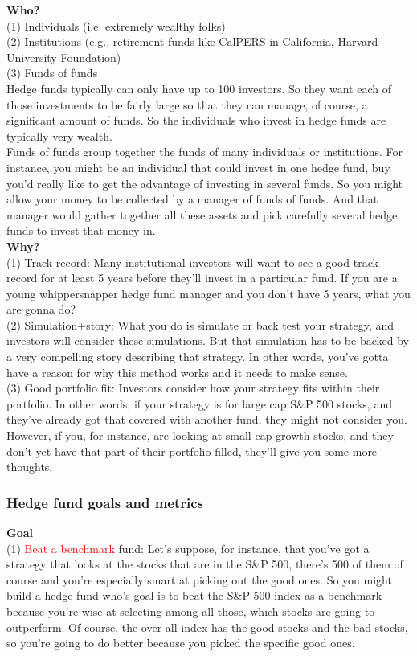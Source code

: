\documentclass[12pt]{article}
\begin{document}
\noindent
\textbf{Who?} \\
(1) Individuals (i.e. extremely wealthy folks)\\
(2) Institutions (e.g., retirement funds like CalPERS in California, Harvard University Foundation) \\
(3) Funds of funds \\
Hedge funds typically can only have up to 100 investors. So they want each of those investments to be fairly large so that they can manage, of course, a significant amount of funds. So the individuals who invest in hedge funds are typically very wealth. \\
Funds of funds group together the funds of many individuals or institutions. For instance, you might be an individual that could invest in one hedge fund, buy you'd really like to get the advantage of investing in several funds. So you might allow your money to be collected by a manager of funds of funds. And that manager would gather together all these assets and pick carefully several hedge funds to invest that money in. \\[5pt]
\noindent
\textbf{Why?} \\
(1) Track record: Many institutional investors will want to see a good track record for at least 5 years before they'll invest in a particular fund. If you are a young whippersnapper hedge fund manager and you don't have 5 years, what you are gonna do? \\
(2) Simulation+story: What you do is simulate or back test your strategy, and investors will consider these simulations. But that simulation has to be backed by a very compelling story describing that strategy. In other words, you've gotta have a reason for why this method works and it needs to make sense. \\
(3) Good portfolio fit: Investors consider how your strategy fits within their portfolio. In other words, if your strategy is for large cap S\&P 500 stocks, and they've already got that covered with another fund, they might not consider you. However, if you, for instance, are looking at small cap growth stocks, and they don't yet have that part of their portfolio filled, they'll give you some more thoughts. 

\subsubsection{Hedge fund goals and metrics}

\noindent
\textbf{Goal} \\
(1) \textcolor{red}{Beat a benchmark} fund: Let's suppose, for instance, that you've got a strategy that looks at the stocks that are in the S\&P 500, there's 500 of them of course and you're especially smart at picking out the good ones. So you might build a hedge fund who's goal is to beat the S\&P 500 index as a benchmark because you're wise at selecting among all those, which stocks are going to outperform. Of course, the over all index has the good stocks and the bad stocks, so you're going to do better because you picked the specific good ones. 
\end{document}
